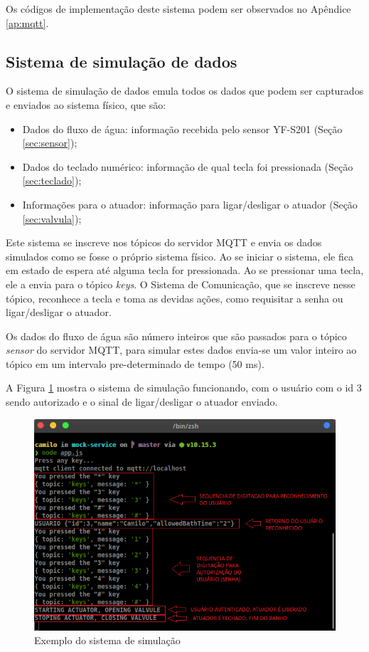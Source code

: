 Os códigos de implementação deste sistema podem ser observados no Apêndice \ref{ap:mqtt}.

\subsection{Sistema de simulação de dados} \label{sec:sistemasimulacao}

O sistema de simulação de dados emula todos os dados que podem ser capturados e enviados ao sistema físico, que são:

\begin{itemize}
	\item Dados do fluxo de água: informação recebida pelo sensor YF-S201 (Seção \ref{sec:sensor});
	\item Dados do teclado numérico: informação de qual tecla foi pressionada (Seção \ref{sec:teclado});
	\item Informações para o atuador: informação para ligar/desligar o atuador (Seção \ref{sec:valvula});
\end{itemize}

Este sistema se inscreve nos tópicos do servidor MQTT e envia os dados simulados como se fosse o próprio sistema físico. Ao se iniciar o sistema, ele fica em estado de espera até alguma tecla for pressionada. Ao se pressionar uma tecla, ele a envia para o tópico \textit{keys}. O Sistema de Comunicação, que se inscreve nesse tópico, reconhece a tecla e toma as devidas ações, como requisitar a senha ou ligar/desligar o atuador.

Os dados do fluxo de água são número inteiros que são passados para o tópico \textit{sensor} do servidor MQTT, para simular estes dados envia-se um valor inteiro ao tópico em um intervalo pre-determinado de tempo (50 ms).

A Figura \ref{fig:mockservice} mostra o sistema de simulação funcionando, com o usuário com o id 3 sendo autorizado e o sinal de ligar/desligar o atuador enviado.

\begin{figure}[htbp]
	\centering
	\includegraphics[width=0.6\linewidth]{figuras/mockservice.png}
	\caption{Exemplo do sistema de simulação}
	\label{fig:mockservice}
\end{figure}

